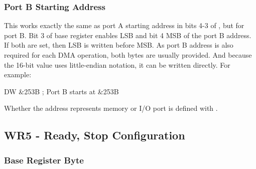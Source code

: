 {\begin{DMADescription}
\end{DMADescription}


\subsubsection{Port B Starting Address}

This works exactly the same as port A starting address in bits 4-3 of , but for port B. Bit 3 of base register enables LSB and bit 4 MSB of the port B address. If both are set, then LSB is written before MSB. As port B address is also required for each DMA operation, both bytes are usually provided. And because the 16-bit value uses little-endian notation, it can be written directly. For example:

\begin{tcblisting}{}
	DW &253B          ; Port B starts at &253B
\end{tcblisting}
\vspace*{-1ex}

Whether the address represents memory or I/O port is defined with .


\subsection{WR5 - Ready, Stop Configuration}




\subsubsection{Base Register Byte}

}
